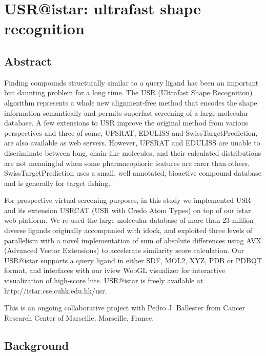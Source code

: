 \chapter{USR@istar: ultrafast shape recognition}
\label{usr}

\section{Abstract}

Finding compounds structurally similar to a query ligand has been an important but daunting problem for a long time. The USR (Ultrafast Shape Recognition) algorithm represents a whole new alignment-free method that encodes the shape information semantically and permits superfast screening of a large molecular database. A few extensions to USR improve the original method from various perspectives and three of some, UFSRAT, EDULISS and SwissTargetPrediction, are also available as web servers. However, UFSRAT and EDULISS are unable to discriminate between long, chain-like molecules, and their calculated distributions are not meaningful when some pharmacophoric features are rarer than others. SwissTargetPrediction uses a small, well annotated, bioactive compound database and is generally for target fishing.

For prospective virtual screening purposes, in this study we implemented USR and its extension USRCAT (USR with Credo Atom Types) on top of our istar web platform. We re-used the large molecular database of more than 23 million diverse ligands originally accompanied with idock, and exploited three levels of parallelism with a novel implementation of sum of absolute differences using AVX (Advanced Vector Extensions) to accelerate similarity score calculation. Our USR@istar supports a query ligand in either SDF, MOL2, XYZ, PDB or PDBQT format, and interfaces with our iview WebGL visualizer for interactive visualization of high-score hits. USR@istar is freely available at http://istar.cse.cuhk.edu.hk/usr.

This is an ongoing collaborative project with Pedro J. Ballester from Cancer Research Center of Marseille, Marseille, France.

\section{Background}

